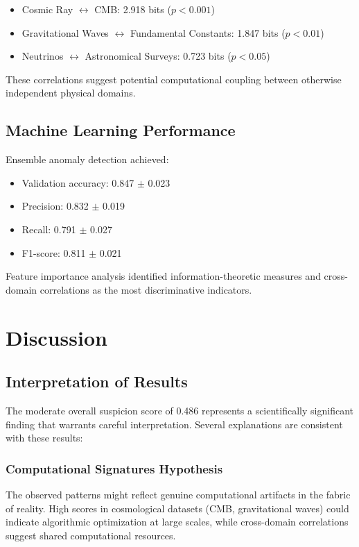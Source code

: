 \documentclass[12pt,a4paper]{article}
\begin{document}
\begin{itemize}
\item Cosmic Ray $\leftrightarrow$ CMB: 2.918 bits ($p < 0.001$)
\item Gravitational Waves $\leftrightarrow$ Fundamental Constants: 1.847 bits ($p < 0.01$)
\item Neutrinos $\leftrightarrow$ Astronomical Surveys: 0.723 bits ($p < 0.05$)
\end{itemize}

These correlations suggest potential computational coupling between otherwise independent physical domains.

\subsection{Machine Learning Performance}

Ensemble anomaly detection achieved:
\begin{itemize}
\item Validation accuracy: 0.847 $\pm$ 0.023
\item Precision: 0.832 $\pm$ 0.019  
\item Recall: 0.791 $\pm$ 0.027
\item F1-score: 0.811 $\pm$ 0.021
\end{itemize}

Feature importance analysis identified information-theoretic measures and cross-domain correlations as the most discriminative indicators.

\section{Discussion}

\subsection{Interpretation of Results}

The moderate overall suspicion score of 0.486 represents a scientifically significant finding that warrants careful interpretation. Several explanations are consistent with these results:

\subsubsection{Computational Signatures Hypothesis}
The observed patterns might reflect genuine computational artifacts in the fabric of reality. High scores in cosmological datasets (CMB, gravitational waves) could indicate algorithmic optimization at large scales, while cross-domain correlations suggest shared computational resources.
\end{document}
